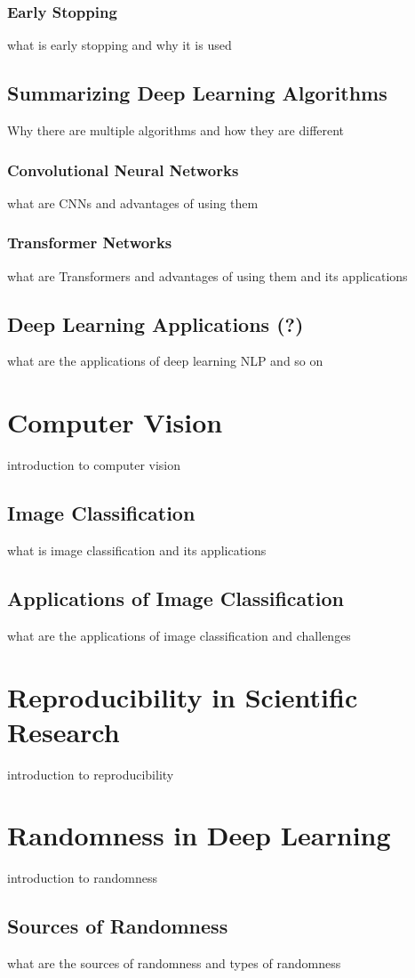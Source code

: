 \subsubsection{Early Stopping}
what is early stopping and why it is used
\subsection{Summarizing Deep Learning Algorithms}
Why there are multiple algorithms and how they are different
\subsubsection{Convolutional Neural Networks}
what are CNNs and advantages of using them
\subsubsection{Transformer Networks}
what are Transformers and advantages of using them and its applications
\subsection{Deep Learning Applications (?)}
what are the applications of deep learning NLP and so on
\section{Computer Vision}
introduction to computer vision
\subsection{Image Classification}
what is image classification and its applications 
\subsection{Applications of Image Classification}
what are the applications of image classification and challenges
\section{Reproducibility in Scientific Research}
introduction to reproducibility
\section{Randomness in Deep Learning}
introduction to randomness
\subsection{Sources of Randomness}
what are the sources of randomness and types of randomness
